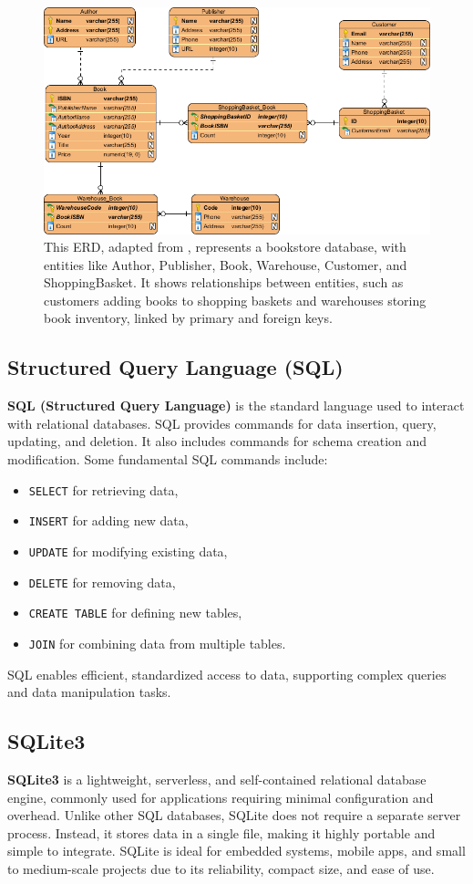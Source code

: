 \begin{figure}[h]
	\centering
	\includegraphics[width=0.9\linewidth]{assets/ch2/ERD}
	\caption{This ERD, adapted from \cite{visual-paradigm}, represents a bookstore database, with entities like Author, Publisher, Book, Warehouse, Customer, and ShoppingBasket. It shows relationships between entities, such as customers adding books to shopping baskets and warehouses storing book inventory, linked by primary and foreign keys.}
	\label{fig:erd}
\end{figure}


\subsection{Structured Query Language (SQL)}
\textbf{SQL (Structured Query Language)} is the standard language used to interact with relational databases. SQL provides commands for data insertion, query, updating, and deletion. It also includes commands for schema creation and modification. Some fundamental SQL commands include:

\begin{itemize}
	\item \texttt{SELECT} for retrieving data,
	\item \texttt{INSERT} for adding new data,
	\item \texttt{UPDATE} for modifying existing data,
	\item \texttt{DELETE} for removing data,
	\item \texttt{CREATE TABLE} for defining new tables,
	\item \texttt{JOIN} for combining data from multiple tables.
\end{itemize}

SQL enables efficient, standardized access to data, supporting complex queries and data manipulation tasks.

\subsection{SQLite3}
\textbf{SQLite3} is a lightweight, serverless, and self-contained relational database engine, commonly used for applications requiring minimal configuration and overhead. Unlike other SQL databases, SQLite does not require a separate server process. Instead, it stores data in a single file, making it highly portable and simple to integrate. SQLite is ideal for embedded systems, mobile apps, and small to medium-scale projects due to its reliability, compact size, and ease of use.
